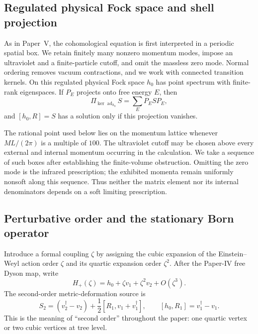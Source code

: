 \documentclass[11pt]{article}
\theoremstyle{definition}
\theoremstyle{remark}
\newcommand{\dg}{\dagger}
\newcommand{\ad}{\operatorname{ad}}
\newcommand{\PiE}{\Pi_{\ker\ad_{h_0}}}
\begin{document}
\subsection{Regulated physical Fock space and shell projection}

As in Paper~V, the cohomological equation is first interpreted in a
periodic spatial box.  We retain finitely many nonzero momentum modes,
impose an ultraviolet and a finite-particle cutoff, and omit the
massless zero mode.  Normal ordering removes vacuum contractions, and
we work with connected transition kernels.  On this regulated physical
Fock space $h_0$ has point spectrum with finite-rank eigenspaces.  If
$P_E$ projects onto free energy $E$, then
\begin{equation}\label{eq:kernelproj}
\PiE S=\sum_E P_ESP_E,
\end{equation}
and $[h_0,R]=S$ has a solution only if this projection vanishes.

The rational point used below lies on the momentum lattice whenever
$ML/(2\pi)$ is a multiple of $100$.  The ultraviolet cutoff may be
chosen above every external and internal momentum occurring in the
calculation.  We take a sequence of such boxes after establishing the
finite-volume obstruction.  Omitting the zero mode is the infrared
prescription; the exhibited momenta remain uniformly nonsoft along this
sequence.  Thus neither the matrix element nor its internal denominators
depends on a soft limiting prescription.

\subsection{Perturbative order and the stationary Born operator}

Introduce a formal coupling $\zeta$ by assigning the cubic expansion of
the Einstein--Weyl action order $\zeta$ and its quartic expansion order
$\zeta^2$.  After the Paper-IV free Dyson map, write
\begin{equation}\label{eq:positiveexpansion}
H_+(\zeta)=h_0+\zeta v_1+\zeta^2v_2+O(\zeta^3).
\end{equation}
The second-order metric-deformation source is
\begin{equation}\label{eq:S2definition}
S_2=(v_2^{\dg}-v_2)
+\frac12[R_1,v_1+v_1^{\dg}],
\qquad [h_0,R_1]=v_1^{\dg}-v_1.
\end{equation}
This is the meaning of ``second order'' throughout the paper: one
quartic vertex or two cubic vertices at tree level.
\end{document}
